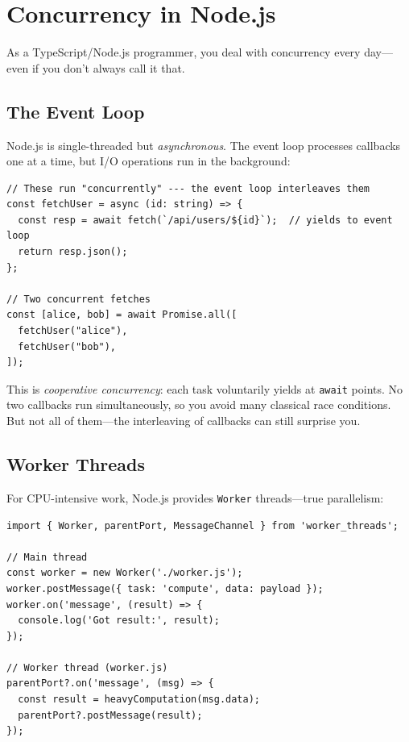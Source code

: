 \documentclass[11pt, a4paper, oneside]{book}
\newcommand{\lc}[1]{\texttt{#1}}
\begin{document}
\section{Concurrency in Node.js}

As a TypeScript/Node.js programmer, you deal with concurrency every day---even
if you don't always call it that.

\subsection{The Event Loop}

Node.js is single-threaded but \emph{asynchronous}. The event loop processes
callbacks one at a time, but I/O operations run in the background:

\begin{tsbox}
\begin{verbatim}
// These run "concurrently" --- the event loop interleaves them
const fetchUser = async (id: string) => {
  const resp = await fetch(`/api/users/${id}`);  // yields to event loop
  return resp.json();
};

// Two concurrent fetches
const [alice, bob] = await Promise.all([
  fetchUser("alice"),
  fetchUser("bob"),
]);
\end{verbatim}
\end{tsbox}

This is \emph{cooperative concurrency}: each task voluntarily yields at
\lc{await} points. No two callbacks run simultaneously, so you avoid many
classical race conditions. But not all of them---the interleaving of
callbacks can still surprise you.

\subsection{Worker Threads}

For CPU-intensive work, Node.js provides \lc{Worker} threads---true
parallelism:

\begin{tsbox}
\begin{verbatim}
import { Worker, parentPort, MessageChannel } from 'worker_threads';

// Main thread
const worker = new Worker('./worker.js');
worker.postMessage({ task: 'compute', data: payload });
worker.on('message', (result) => {
  console.log('Got result:', result);
});

// Worker thread (worker.js)
parentPort?.on('message', (msg) => {
  const result = heavyComputation(msg.data);
  parentPort?.postMessage(result);
});
\end{verbatim}
\end{tsbox}
\end{document}
